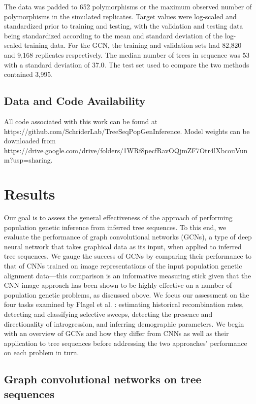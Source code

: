 The data was padded to 652 polymorphisms or the maximum observed number of polymorphisms in the simulated replicates. Target values were log-scaled and standardized prior to training and testing, with the validation and testing data being standardized according to the mean and standard deviation of the log-scaled training data. For the GCN, the training and validation sets had 82,820 and 9,168 replicates respectively. The median number of trees in sequence was 53 with a standard deviation of 37.0. The test set used to compare the two methods contained 3,995.

\subsection{Data and Code Availability}

All code associated with this work can be found at https://github.com/SchriderLab/TreeSeqPopGenInference. Model weights can be downloaded from \\https://drive.google.com/drive/folders/1WRf8pecfRavOQjmZF7Otr4lXbcouVunm?usp=sharing.

\section{Results}

Our goal is to assess the general effectiveness of the approach of performing population genetic inference from inferred tree sequences. To this end, we evaluate the performance of graph convolutional networks (GCNs), a type of deep neural network that takes graphical data as its input, when applied to inferred tree sequences. We gauge the success of GCNs by comparing their performance to that of CNNs trained on image representations of the input population genetic alignment data—this comparison is an informative measuring stick given that the CNN-image approach has been shown to be highly effective on a number of population genetic problems, as discussed above. We focus our assessment on the four tasks examined by Flagel et al. \cite{flagelUnreasonableEffectivenessConvolutional2019}: estimating historical recombination rates, detecting and classifying selective sweeps, detecting the presence and directionality of introgression, and inferring demographic parameters. We begin with an overview of GCNs and how they differ from CNNs as well as their application to tree sequences before addressing the two approaches' performance on each problem in turn.

\subsection{Graph convolutional networks on tree sequences}

